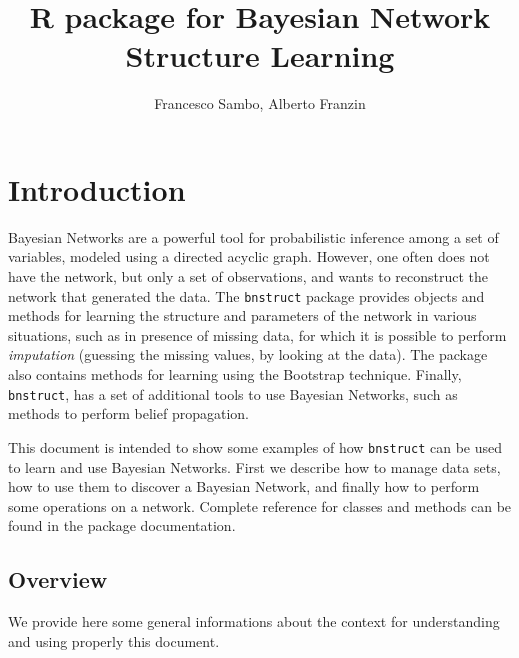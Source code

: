 \documentclass{article}\usepackage[]{graphicx}\usepackage[]{color}
\newcommand{\Rpackage}[1]{{\texttt{#1}}}
\begin{document}
\title{R package for Bayesian Network Structure Learning}
\author{Francesco Sambo, Alberto Franzin}
\maketitle



\section{Introduction}
Bayesian Networks are a powerful tool for probabilistic inference among a set
of variables, modeled using a directed acyclic graph. However, one often does not
have the network, but only a set of observations, and wants to reconstruct the
network that generated the data. The \Rpackage{bnstruct} package provides objects and methods for
learning the structure and parameters of the network in various situations, such as
in presence of missing data, for which it is possible to perform \textit{imputation}
(guessing the missing values, by looking at the data). The package also contains methods
for learning using the Bootstrap technique.
Finally, \Rpackage{bnstruct}, has a set of additional tools to use Bayesian Networks, such as methods to perform
belief propagation.

This document is intended to show some examples of how \Rpackage{bnstruct} can be used
to learn and use Bayesian Networks. First we describe how to manage data sets,
how to use them to discover a Bayesian Network, and finally how to perform some
operations on a network. Complete reference for classes and methods can be found in the package documentation.

\subsection{Overview}
We provide here some general informations about the context for understanding
and using properly this document.
\end{document}
